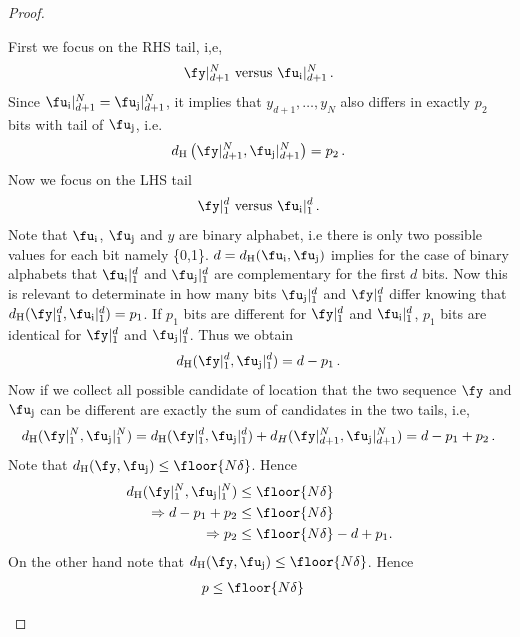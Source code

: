 \begin{proof}
\begin{itemize}
\begin{enumerate}
First we focus on the RHS tail, i,e,
%
\begin{align}
 \fy|_{d+1}^N \text{ versus } {\fu_\text{i}}|_{d+1}^N\,.\,
\end{align}
%
Since ${\fu_\text{i}}|_{d+1}^N = {\fu_\text{j}}|_{d+1}^N$,
it implies that $y_{d+1},\ldots,y_N$ also differs in exactly $p_2$ bits with tail of $\fu_\text{j}$, i.e.
\begin{align}
    d_{\text{H}}\left(\fy|_{d+1}^N,{\fu_\text{j}}|_{d+1}^N\right) = p_2\,.\,
\end{align}
Now we focus on the LHS tail
%
\begin{align}
 \fy|_1^{d} \text{ versus } {\fu_\text{i}}|_1^{d}\,.\,
\end{align}
%
Note that $\fu_\text{i}$, $\fu_\text{j}$ and $y$ are binary alphabet, i.e there is only two possible values for each bit namely \{0,1\}. $d=d_{\text{H}}(\fu_\text{i},\fu_\text{j})$ implies for the case of binary alphabets that ${\fu_\text{i}}|_1^{d}$ and ${\fu_\text{j}}|_1^{d}$ are complementary for the first $d$ bits. Now this is relevant to determinate in how many bits ${\fu_\text{j}}|_1^{d}$ and  ${\fy}|_1^{d}$ differ knowing that $d_{\text{H}}(\fy|_1^d,{\fu_\text{i}}|_1^d) = p_1$. If $p_1$ bits are different for $\fy|_1^d$ and $\fu_\text{i}|_1^d$, $p_1$ bits are identical for $\fy|_1^d$ and $\fu_\text{j}|_1^d$. Thus we obtain
\begin{align}
    d_{\text{H}}(\fy|_1^d,{\fu_\text{j}}|_1^d) = d-p_1\,.\,
\end{align}
Now if we collect all possible candidate of location that the two sequence $\fy$ and $\fu_\text{j}$ can be different are exactly the sum of candidates in the two tails, i.e,
\begin{align}
    d_{\text{H}}(\fy|_1^N,{\fu_\text{j}}|_1^N) = d_{\text{H}}(\fy|_1^d,{\fu_\text{j}}|_1^d)+d_H(\fy|_{d+1}^N,{\fu_\text{j}}|_{d+1}^N)= d-p_1+p_2\,.\,
\end{align} 
Note that  $d_{\text{H}}(\fy,\fu_\text{j})\leq \floor{N\delta}$. Hence
\begin{align}
    d_{\text{H}}(\fy|_1^N,{\fu_\text{j}}|_1^N) &\leq \floor{N\delta}
    \\
    \Rightarrow d-p_1+p_2 &\leq \floor{N\delta}
    \\
    \Rightarrow p_2 &\leq \floor{N\delta}-d+p_1.
\end{align} 
On the other hand note that $d_{\text{H}}(\fy,\fu_\text{j})\leq \floor{N\delta}$. Hence 
\begin{align}
    p &\leq\floor{N\delta}

\end{align}
\end{enumerate}
\end{itemize}
\end{proof}
